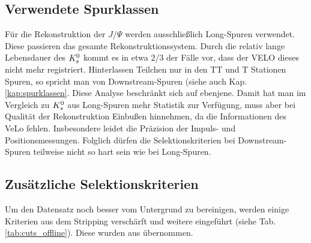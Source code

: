 \subsection{Verwendete Spurklassen} \label{kap:downstream}
Für die Rekonstruktion der $J/\Psi$ werden ausschließlich \glqq Long\grqq-Spuren verwendet. Diese passieren das gesamte Rekonstruktionssystem. Durch die relativ lange Lebensdauer des $K_s^0$ kommt es in etwa 2/3 der Fälle vor, dass der VELO dieses nicht mehr registriert. Hinterlassen Teilchen nur in den TT und T Stationen Spuren, so spricht man von \glqq Downstream\grqq-Spuren (siehe auch Kap. \ref{kap:spurklassen}. Diese Analyse beschränkt sich auf ebenjene. Damit hat man im Vergleich zu $K_s^0$ aus Long-Spuren mehr Statistik zur Verfügung, muss aber bei Qualität der Rekonstruktion Einbußen hinnehmen, da die Informationen des VeLo fehlen. Insbesondere leidet die Präzision der Impuls- und Positionsmessungen. Folglich dürfen die Selektionskriterien bei Downstream-Spuren teilweise nicht so hart sein wie bei Long-Spuren. \cite{lhcb-paper}

\subsection{Zusätzliche Selektionskriterien}
Um den Datensatz noch besser vom Untergrund zu bereinigen, werden einige Kriterien aus dem Stripping verschärft und weitere eingeführt (siehe Tab. \ref{tab:cuts_offline}). Diese wurden aus \cite{lhcb-paper} übernommen.

